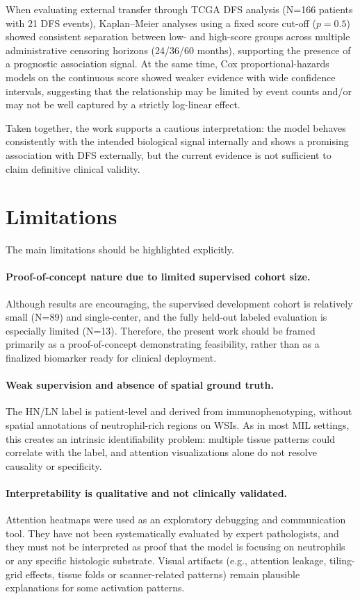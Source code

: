 When evaluating external transfer through TCGA DFS analysis (N=166 patients with 21 DFS events), Kaplan--Meier analyses using a fixed score cut-off ($p=0.5$) showed consistent separation between low- and high-score groups across multiple administrative censoring horizons (24/36/60 months), supporting the presence of a prognostic association signal.
At the same time, Cox proportional-hazards models on the continuous score showed weaker evidence with wide confidence intervals, suggesting that the relationship may be limited by event counts and/or may not be well captured by a strictly log-linear effect.

Taken together, the work supports a cautious interpretation: the model behaves consistently with the intended biological signal internally and shows a promising association with DFS externally, but the current evidence is not sufficient to claim definitive clinical validity.

\section{Limitations}
The main limitations should be highlighted explicitly.

\paragraph{Proof-of-concept nature due to limited supervised cohort size.}
Although results are encouraging, the supervised development cohort is relatively small (N=89) and single-center, and the fully held-out labeled evaluation is especially limited (N=13). Therefore, the present work should be framed primarily as a proof-of-concept demonstrating feasibility, rather than as a finalized biomarker ready for clinical deployment.

\paragraph{Weak supervision and absence of spatial ground truth.}
The HN/LN label is patient-level and derived from immunophenotyping, without spatial annotations of neutrophil-rich regions on WSIs. As in most MIL settings, this creates an intrinsic identifiability problem: multiple tissue patterns could correlate with the label, and attention visualizations alone do not resolve causality or specificity.

\paragraph{Interpretability is qualitative and not clinically validated.}
Attention heatmaps were used as an exploratory debugging and communication tool. They have not been systematically evaluated by expert pathologists, and they must not be interpreted as proof that the model is focusing on neutrophils or any specific histologic substrate. Visual artifacts (e.g., attention leakage, tiling-grid effects, tissue folds or scanner-related patterns) remain plausible explanations for some activation patterns.

